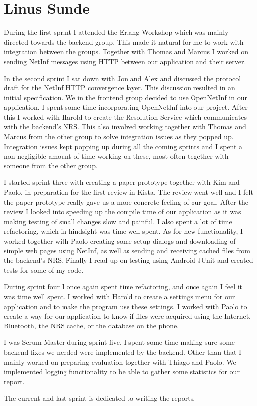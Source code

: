 \section{Linus Sunde}

During the first sprint I attended the Erlang Workshop which was mainly directed towards the backend group. This made it natural for me to work with integration between the groups. Together with Thomas and Marcus I worked on sending NetInf messages using HTTP between our application and their server.

In the second sprint I sat down with Jon and Alex and discussed the protocol draft for the NetInf HTTP convergence layer. This discussion resulted in an initial specification. We in the frontend group decided to use OpenNetInf in our application. I spent some time incorporating OpenNetInf into our project. After this I worked with Harold to create the Resolution Service which communicates with the backend's NRS. This also involved working together with Thomas and Marcus from the other group to solve integration issues as they popped up. Integration issues kept popping up during all the coming sprints and I spent a non-negligible amount of time working on these, most often together with someone from the other group.

I started sprint three with creating a paper prototype together with Kim and Paolo, in preparation for the first review in Kista. The review went well and I felt the paper prototype really gave us a more concrete feeling of our goal. After the review I looked into speeding up the compile time of our application as it was making testing of small changes slow and painful. I also spent a lot of time refactoring, which in hindsight was time well spent. As for new functionality, I worked together with Paolo creating some setup dialogs and downloading of simple web pages using NetInf, as well as sending and receiving cached files from the backend's NRS. Finally I read up on testing using Android JUnit and created tests for some of my code.

During sprint four I once again spent time refactoring, and once again I feel it was time well spent. I worked with Harold to create a settings menu for our application and to make the program use these settings. I worked with Paolo to create a way for our application to know if files were acquired using the Internet, Bluetooth, the NRS cache, or the database on the phone.

I was Scrum Master during sprint five. I spent some time making sure some backend fixes we needed were implemented by the backend. Other than that I mainly worked on preparing evaluation together with Thiago and Paolo. We implemented logging functionality to be able to gather some statistics for our report.

The current and last sprint is dedicated to writing the reports.
